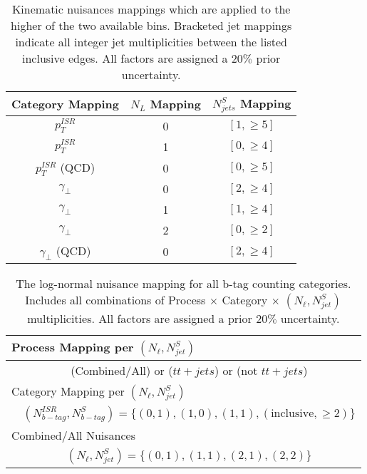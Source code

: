 \begin{table}
\centering
\caption{Kinematic nuisances mappings which are applied to the higher of the two available bins. Bracketed jet mappings indicate all integer jet multiplicities between the listed inclusive edges. All factors are assigned a $20\%$ prior uncertainty.}
\begin{tabular}{ccc}
\hline 
Category Mapping & $N_L$ Mapping & $N_{jets}^S$  Mapping \\ 
\hline 
\hline
$p_T^{ISR}$  & 0 & $[1,\geq5]$ \\ 
$p_T^{ISR}$ & 1 & $[0,\geq4]$ \\ 
$p_T^{ISR}$ (QCD) & 0 & $[0,\geq5]$ \\ 
$\gamma_\perp$ & 0 & $[2,\geq4]$ \\ 
$\gamma_\perp$ & 1 & $[1,\geq4]$ \\ 
$\gamma_\perp$ & 2 & $[0,\geq2]$ \\  
$\gamma_\perp$ (QCD) & 0 & $[2,\geq4]$ \\ 
\hline 
\end{tabular} 
\label{tab:kinnuisance}
\end{table}


\begingroup

\begin{table}
\centering
\caption{The log-normal nuisance mapping for all b-tag counting categories. Includes all combinations of Process $\times$ Category $\times$ $(N_\ell,N_{jet}^S)$ multiplicities. All factors are assigned a prior $20\%$ uncertainty.}
\setlength{\tabcolsep}{10pt} %
\renewcommand{\arraystretch}{1.5} %
\begin{tabular}{lc}

\multicolumn{2}{|l}{Process Mapping per $(N_\ell,N_{jet}^S)$ } \\ 
\hline 
 & (Combined/All) or ($tt+jets$) or (not $tt+jets$)  \\ 
\multicolumn{2}{|l}{Category Mapping per $(N_\ell,N_{jet}^S)$ } \\ 
\hline 
 & $(N_{b-tag}^{ISR},N_{b-tag}^S)=\{(0,1),(1,0),(1,1),( \text{inclusive} ,\geq2) \}$ \\ 
\multicolumn{2}{|l}{Combined/All Nuisances}  \\ 
\hline 
 & $(N_\ell,N_{jet}^S)=\{(0,1),(1,1),(2,1),(2,2) \}$ \\ 

\end{tabular} 
\label{tab:btagnuisance}
\end{table}
\endgroup

